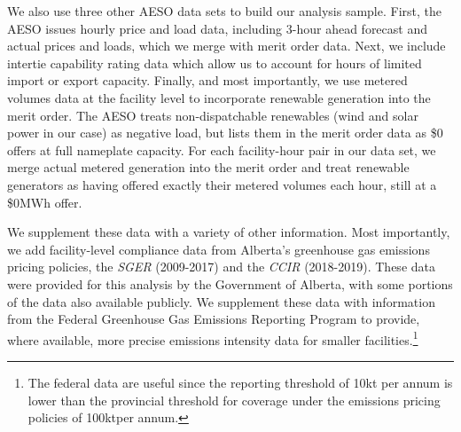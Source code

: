 \documentclass[12pt]{article}
\newcommand{\SGER}{\textit{SGER} }
\newcommand{\CCIR}{\textit{CCIR} }
\newcommand{\coe}{\text{CO$_2$e }}
\begin{document}
We also use three other AESO data sets to build our analysis sample. First, the AESO issues hourly price and load data, including 3-hour ahead forecast and actual prices and loads, which we merge with merit order data. Next, we include intertie capability rating data which allow us to account for hours of limited import or export capacity. Finally, and most importantly, we use metered volumes data at the facility level to incorporate renewable generation into the merit order. The AESO treats non-dispatchable renewables (wind and solar power in our case) as negative load, but lists them in the merit order data as \$0 offers at full nameplate capacity. For each facility-hour pair in our data set, we merge actual metered generation into the merit order and treat renewable generators as having offered exactly their metered volumes each hour, still at a \$0MWh offer.

We supplement these data with a variety of other information.  Most importantly, we add facility-level compliance data from Alberta's greenhouse gas emissions pricing policies, the \SGER (2009-2017) and the \CCIR (2018-2019). These data were provided for this analysis by the Government of Alberta, with some portions of the data also available publicly. We supplement these data with information from the Federal Greenhouse Gas Emissions Reporting Program to provide, where available, more precise emissions intensity data for smaller facilities.\footnote{The federal data are useful since the reporting threshold of 10kt \coe per annum is lower than the provincial threshold for coverage under the emissions pricing policies of 100kt\coe per annum.}
\end{document}
